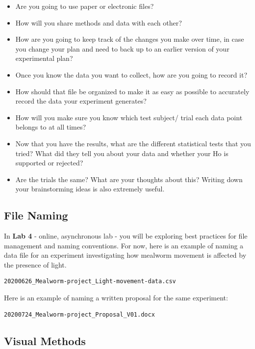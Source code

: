 \documentclass[
]{book}
\providecommand{\tightlist}{%
  \setlength{\itemsep}{0pt}\setlength{\parskip}{0pt}}
\begin{document}
\begin{itemize}
\tightlist
\item
  Are you going to use paper or electronic files?
\item
  How will you share methods and data with each other?
\item
  How are you going to keep track of the changes you make over time, in case you change your plan and need to back up to an earlier version of your experimental plan?
\item
  Once you know the data you want to collect, how are you going to record it?
\item
  How should that file be organized to make it as easy as possible to accurately record the data your experiment generates?
\item
  How will you make sure you know which test subject/ trial each data point belongs to at all times?
\item
  Now that you have the results, what are the different statistical tests that you tried? What did they tell you about your data and whether your Ho is supported or rejected?
\item
  Are the trials the same? What are your thoughts about this? Writing down your brainstorming ideas is also extremely useful.
\end{itemize}

\hypertarget{file-naming}{%
\subsection*{File Naming}\label{file-naming}}

In \textbf{Lab 4} - online, asynchronous lab - you will be exploring best practices for file management and naming conventions. For now, here is an example of naming a data file for an experiment investigating how mealworm movement is affected by the presence of light.

\begin{verbatim}
20200626_Mealworm-project_Light-movement-data.csv 
\end{verbatim}

Here is an example of naming a written proposal for the same experiment:

\begin{verbatim}
20200724_Mealworm-project_Proposal_V01.docx
\end{verbatim}

\hypertarget{visual-methods}{%
\subsection*{Visual Methods}\label{visual-methods}}
\end{document}
